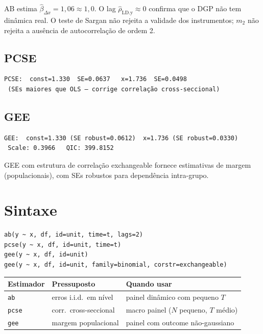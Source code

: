 AB estima $\hat\beta_{\Delta x} = 1{,}06 \approx 1{,}0$. O lag $\hat\rho_{\mathrm{LD.y}} \approx 0$ confirma que o DGP não tem dinâmica real. O teste de Sargan não rejeita a validade dos instrumentos; $m_2$ não rejeita a ausência de autocorrelação de ordem 2.

\subsection*{PCSE}

\begin{lstlisting}[language={}, basicstyle=\ttfamily\small,
  frame=none, numbers=none, backgroundcolor=\color{codbg},
  xleftmargin=0pt, xrightmargin=0pt, breaklines=false]
 PCSE:  const=1.330  SE=0.0637   x=1.736  SE=0.0498
 (SEs maiores que OLS — corrige correlação cross-seccional)
\end{lstlisting}

\subsection*{GEE}

\begin{lstlisting}[language={}, basicstyle=\ttfamily\small,
  frame=none, numbers=none, backgroundcolor=\color{codbg},
  xleftmargin=0pt, xrightmargin=0pt, breaklines=false]
 GEE:  const=1.330 (SE robust=0.0612)  x=1.736 (SE robust=0.0330)
 Scale: 0.3966   QIC: 399.8152
\end{lstlisting}

GEE com estrutura de correlação exchangeable fornece estimativas de margem
(populacionais), com SEs robustos para dependência intra-grupo.

\section{Sintaxe}

\begin{lstlisting}
ab(y ~ x, df, id=unit, time=t, lags=2)
pcse(y ~ x, df, id=unit, time=t)
gee(y ~ x, df, id=unit)
gee(y ~ x, df, id=unit, family=binomial, corstr=exchangeable)
\end{lstlisting}

\begin{center}
\begin{tabular}{lll}
\toprule
\textbf{Estimador} & \textbf{Pressuposto} & \textbf{Quando usar} \\
\midrule
\texttt{ab}    & erros i.i.d.\ em nível & painel dinâmico com pequeno $T$ \\
\texttt{pcse}  & corr.\ cross-seccional & macro painel ($N$ pequeno, $T$ médio) \\
\texttt{gee}   & margem populacional     & painel com outcome não-gaussiano \\
\bottomrule
\end{tabular}
\end{center}
